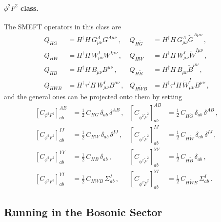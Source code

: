\paragraph{$\phi^2 F^2$ class.} 
The SMEFT operators in this class are
\begin{align}
    Q_{HG} &= H^\dagger H\, G^A_{\mu\nu}G^{A\mu\nu}\,,&
    Q_{H\widetilde G} &= H^\dagger H\, G^A_{\mu\nu}\widetilde G^{A\mu\nu}\,,\\
    Q_{HW} &= H^\dagger H\, W^I_{\mu\nu}W^{I\mu\nu}\,,&
    Q_{H\widetilde W} &= H^\dagger H\, W^I_{\mu\nu}\widetilde W^{I\mu\nu}\,,\\
    Q_{HB} &= H^\dagger H\, B_{\mu\nu}B^{\mu\nu}\,,&
    Q_{H\widetilde B} &= H^\dagger H\, B_{\mu\nu}\widetilde B^{\mu\nu}\,,\\
    Q_{HWB} &= H^\dagger\tau^I H\, W^I_{\mu\nu}B^{\mu\nu}\,,&
    Q_{H\widetilde WB} &= H^\dagger\tau^I H\, \widetilde W^I_{\mu\nu} B^{\mu\nu}\,,
\end{align}
and the general ones can be projected onto them by setting
\begin{align}
    \left[C_{\phi^2 F^2}\right]^{AB}_{ab} &= \frac{1}{2}\,C_{HG}\,\delta_{ab}\,\delta^{AB}\,, & 
    \left[C_{\phi^2 \widetilde F^2}\right]^{AB}_{ab} &= \frac{1}{2}\,C_{H\widetilde G}\,\delta_{ab}\,\delta^{AB}\,,\label{eq:CHG_matching}\\
    \left[C_{\phi^2 F^2}\right]^{IJ}_{ab} &= \frac{1}{2}\,C_{HW}\,\delta_{ab}\,\delta^{IJ}\,,
    &
    \left[C_{\phi^2 \widetilde F^2}\right]^{IJ}_{ab} &= \frac{1}{2}\,C_{H\widetilde W}\,\delta_{ab}\,\delta^{IJ}\,,\label{eq:CHW_matching}\\
    \left[C_{\phi^2 F^2}\right]^{YY}_{ab} &= \frac{1}{2}\,C_{HB}\,\delta_{ab}\,,
    & \left[C_{\phi^2 \widetilde F^2}\right]^{YY}_{ab} &= \frac{1}{2}\,C_{H\widetilde B}\,\delta_{ab}\,,\label{eq:CHB_matching}\\
    \left[C_{\phi^2 F^2}\right]^{YI}_{ab} &= \frac{1}{2}\,C_{HWB}\,\Sigma^I_{ab}\,,
    &
    \left[C_{\phi^2 \widetilde F^2}\right]^{YI}_{ab} &= \frac{1}{2}\,C_{H\widetilde WB}\,\Sigma^I_{ab}\,.\label{eq:CHWB_matching}
\end{align}

\subsection{Running in the Bosonic Sector}

